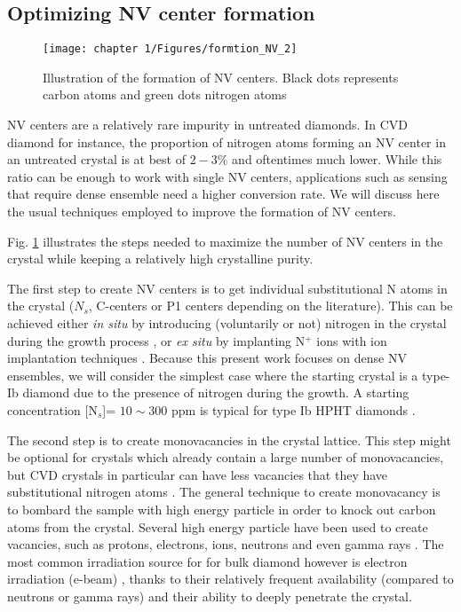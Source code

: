 \documentclass[a4paper, 11pt]{book}
\begin{document}
\subsection{Optimizing NV center formation}
\begin{figure}[h!]
\centering
\texttt{[image: chapter 1/Figures/formtion\_NV\_2]}
\caption{Illustration of the formation of NV centers. Black dots represents carbon atoms and green dots nitrogen atoms}
\label{formation NV}
\end{figure}

NV centers are a relatively rare impurity in untreated diamonds. In CVD diamond for instance, the proportion of nitrogen atoms forming an NV center in an untreated crystal is at best of $2-3 \%$ \citep{hartland2014study} and oftentimes much lower. While this ratio can be enough  to work with single NV centers, applications such as sensing that require dense ensemble need a higher conversion rate. We will discuss here the usual techniques employed to improve the formation of NV centers.

Fig. \ref{formation NV} illustrates the steps needed to maximize the number of NV centers in the crystal while keeping a relatively high crystalline purity.

The first step to create NV centers is to get individual substitutional N atoms in the crystal ($N_s$, C-centers or P1 centers depending on the literature). This can be achieved either \textit{in situ} by introducing (voluntarily or not) nitrogen in the crystal during the growth process \citep{tallaire2006characterisation, lobaev2017influence}, or \textit{ex situ} by implanting N$^+$ ions with ion implantation techniques \citep{meijer2005generation, smith2019colour}. Because this present work focuses on dense NV ensembles, we will consider the simplest case where the starting crystal is a type-Ib diamond due to the presence of nitrogen during the growth. A starting concentration [N$_s$]= $10 \sim 300$ ppm is typical for type Ib HPHT diamonds \citep{achard2020chemical}.

The second step is to create monovacancies in the crystal lattice. This step might be optional for crystals which already contain a large number of monovacancies, but CVD crystals in particular can have less vacancies that they have substitutional nitrogen atoms \citep{mainwood1999point}. The general technique to create monovacancy is to bombard the sample with high energy particle in order to knock out carbon atoms from the crystal. Several high energy particle have been used to create vacancies, such as protons, electrons, ions, neutrons and even gamma rays \citep{davies1976optical, ashbaugh1988gemstone, kleinsasser2016high}. The most common irradiation source for for bulk diamond however is electron irradiation (e-beam) \citep{acosta2009diamonds}, thanks to their relatively frequent availability (compared to neutrons or gamma rays) and their ability to deeply penetrate the crystal.
\end{document}

